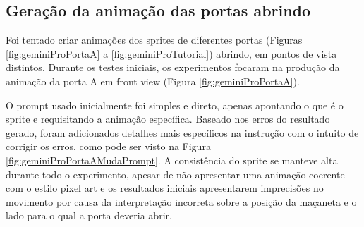 \FloatBarrier
\subsection{Geração da animação das portas abrindo}
\label{s.gemini.animacaoPorta}

Foi tentado criar animações dos sprites de diferentes portas (Figuras \ref{fig:geminiProPortaA} a \ref{fig:geminiProTutorial}) abrindo, em pontos de vista distintos. Durante os testes iniciais, os experimentos focaram na produção da animação da porta A em front view (Figura \ref{fig:geminiProPortaA}).

O prompt usado inicialmente foi simples e direto, apenas apontando o que é o sprite e requisitando a animação específica. Baseado nos erros do resultado gerado, foram adicionados detalhes mais específicos na instrução com o intuito de corrigir os erros, como pode ser visto na Figura \ref{fig:geminiProPortaAMudaPrompt}. A consistência do sprite se manteve alta durante todo o experimento, apesar de não apresentar uma animação coerente com o estilo pixel art e os resultados iniciais apresentarem imprecisões no movimento por causa da interpretação incorreta sobre a posição da maçaneta e o lado para o qual a porta deveria abrir.

